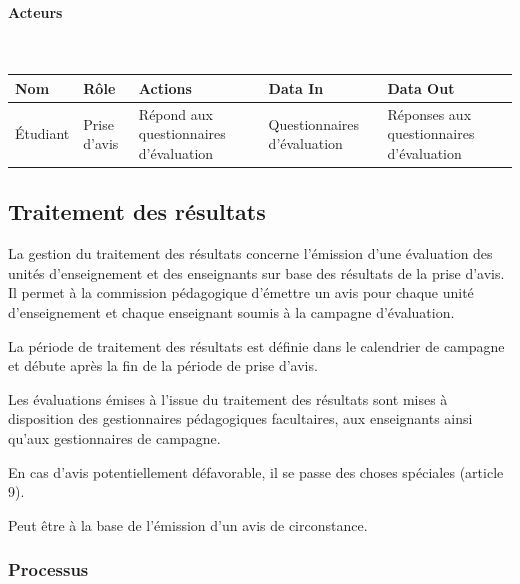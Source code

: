 \documentclass[a4paper,11pt]{report}
\begin{document}
\paragraph{Acteurs}~\newline{}

\begin{tabularx}{\linewidth}{|X|X|X|X|X|} \hline
Nom & Rôle & Actions & Data In & Data Out \\ \hline 
Étudiant & Prise d'avis & Répond aux questionnaires d'évaluation & Questionnaires d'évaluation & Réponses aux questionnaires d'évaluation \\ \hline
\end{tabularx}






\subsection{Traitement des résultats}
La gestion du traitement des résultats concerne l'émission d'une évaluation des unités d'enseignement et des enseignants sur base des résultats de la prise d'avis.
Il permet à la commission pédagogique d'émettre un avis pour chaque unité d'enseignement et chaque enseignant soumis à la campagne d'évaluation.

La période de traitement des résultats est définie dans le calendrier de campagne et débute après la fin de la période de prise d'avis.

Les évaluations émises à l'issue du traitement des résultats sont mises à disposition des gestionnaires pédagogiques facultaires, aux enseignants ainsi qu'aux gestionnaires de campagne.

En cas d'avis potentiellement défavorable, il se passe des choses spéciales (article 9).

Peut être à la base de l'émission d'un avis de circonstance.


\subsubsection{Processus}
\end{document}
